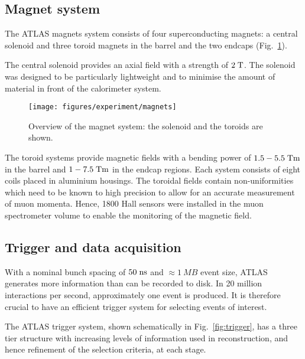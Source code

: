 \subsection{Magnet system}
\label{sec:magnets}

The ATLAS magnets system consists of four superconducting
magnets: a central solenoid and three toroid magnets in the barrel and the
two endcaps (Fig.~\ref{fig:magnets}).

The central solenoid provides an axial field with a strength of \mbox{$2 \; \mathrm{T}$}.
The solenoid was designed to be particularly lightweight and to
minimise the amount of material in front of the calorimeter system.

\begin{figure}[ht]
\begin{center}
\texttt{[image: figures/experiment/magnets]}
\caption[Overview of the magnet system]{
  Overview of the magnet system:
  the solenoid and the toroids are shown.}
\label{fig:magnets}
\end{center}
\end{figure}

The toroid systems provide magnetic fields with a bending power
of \mbox{$1.5 - 5.5 \; \mathrm{Tm}$} in the barrel and \mbox{$1 - 7.5 \; \mathrm{Tm}$} in the endcap regions.
Each system consists of eight coils placed in aluminium housings.
The toroidal fields contain non-uniformities which need to be known to
high precision to allow for an accurate measurement of muon momenta.
Hence, 1800 Hall sensors were installed in the muon spectrometer 
volume to enable the monitoring of the magnetic field.


\subsection{Trigger and data acquisition}
\label{sec:triggerDAQ}

With a nominal bunch spacing of \mbox{$50 \; \mathrm{ns}$} and
\mbox{$\approx{}1~MB$} event size, ATLAS generates more
information than can be recorded to disk. In 20 million 
interactions per second, approximately one \ttbar{} event 
is produced. It is therefore crucial to have an efficient trigger
system for selecting events of interest.

The ATLAS trigger system, shown schematically in
Fig.~\ref{fig:trigger}, has a three tier structure with increasing
levels of information used in reconstruction, and hence refinement of
the selection criteria, at each stage.

